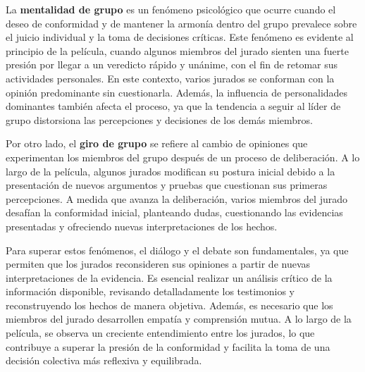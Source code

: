 \documentclass{article}
\begin{document}
La \textbf{mentalidad de grupo} es un fenómeno psicológico que ocurre cuando el deseo de conformidad y de mantener la armonía dentro del grupo prevalece sobre el juicio individual y la toma de decisiones críticas. Este fenómeno es evidente al principio de la película, cuando algunos miembros del jurado sienten una fuerte presión por llegar a un veredicto rápido y unánime, con el fin de retomar sus actividades personales. En este contexto, varios jurados se conforman con la opinión predominante sin cuestionarla. Además, la influencia de personalidades dominantes también afecta el proceso, ya que la tendencia a seguir al líder de grupo distorsiona las percepciones y decisiones de los demás miembros.

Por otro lado, el \textbf{giro de grupo} se refiere al cambio de opiniones que experimentan los miembros del grupo después de un proceso de deliberación. A lo largo de la película, algunos jurados modifican su postura inicial debido a la presentación de nuevos argumentos y pruebas que cuestionan sus primeras percepciones. A medida que avanza la deliberación, varios miembros del jurado desafían la conformidad inicial, planteando dudas, cuestionando las evidencias presentadas y ofreciendo nuevas interpretaciones de los hechos.

Para superar estos fenómenos, el diálogo y el debate son fundamentales, ya que permiten que los jurados reconsideren sus opiniones a partir de nuevas interpretaciones de la evidencia. Es esencial realizar un análisis crítico de la información disponible, revisando detalladamente los testimonios y reconstruyendo los hechos de manera objetiva. Además, es necesario que los miembros del jurado desarrollen empatía y comprensión mutua. A lo largo de la película, se observa un creciente entendimiento entre los jurados, lo que contribuye a superar la presión de la conformidad y facilita la toma de una decisión colectiva más reflexiva y equilibrada.
\end{document}
